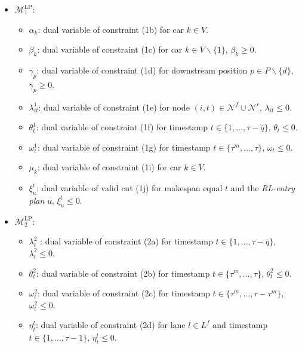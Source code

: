 \documentclass[12pt]{article}
\begin{document}
\vspace{+2mm}

\begin{itemize}[topsep = 0.4pt, itemsep = 0.8pt, parsep = 0pt, labelwidth=0pt, leftmargin=*]
    \item $\mathcal{M}^{\text{LP}}_1$:
    \begin{itemize}[topsep = 0.4pt, itemsep = 0.8pt, parsep = 0pt, labelwidth=0pt, leftmargin=*]
    \item[] $\alpha_{k}$: dual variable of constraint (1b) for car $k\in V$.
    \item[] $\beta_{k}$: dual variable of constraint (1c) for car $k\in V\backslash \{1\}$, $\beta_k\geqslant 0$.
    \item[] $\gamma_p$: dual variable of constraint (1d) for downstream position $p\in P\backslash \{d\}$, $\gamma_p\geqslant 0$.
    \item[] $\lambda^1_{it}$: dual variable of constraint (1e) for node $(i,t)\in \mathcal{N}^{f}\cup \mathcal{N}^{r}$, $\lambda_{it}\leqslant 0$.
    \item[] $\theta^1_t$: dual variable of constraint (1f) for timestamp $t\in \{1,\dots, \tau-\bar{q}\}$, $\theta_{t}\leqslant 0$.
    \item[] $\omega^1_{t}$: dual variable of constraint (1g) for timestamp $t\in \{\tau^m, \dots, \tau\}$, $\omega_t\leqslant 0$.
    \item[] $\mu_k$: dual variable of constraint (1i) for car $k\in V$.
    \item[] $\xi^{t}_u$: dual variable of valid cut (1j) for makespan equal $t$ and the \textit{RL-entry plan} $u$, $\xi^t_u\leqslant 0$.
    \end{itemize}

    \item $\mathcal{M}^{\text{LP}}_2$:
    \begin{itemize}[topsep = 0.4pt, itemsep = 0.8pt, parsep = 0pt, labelwidth=0pt, leftmargin=*]
        \item[] $\lambda^2_{t}$ : dual variable of constraint (2a) for timestamp $t\in \{1,\dots, \tau-\bar{q}\}$, $\lambda^2_t\leqslant 0$.
        \item[] $\theta^2_t$: dual variable of constraint (2b) for timestamp $t\in \{\tau^m, \dots, \tau\}$, $\theta^2_t\leqslant 0$.
        \item[] $\omega^2_t$: dual variable of constraint (2c) for timestamp $t\in \{\tau^m, \dots, \tau-\tau^m\}$, $\omega^2_t\leqslant 0$.
        \item[] $\eta^l_t$: dual variable of constraint (2d) for lane $l\in L^f$ and timestamp $t\in \{1, \dots, \tau-1\}$, $\eta^l_t\leqslant 0$.
    \end{itemize}
\end{itemize}
\end{document}
